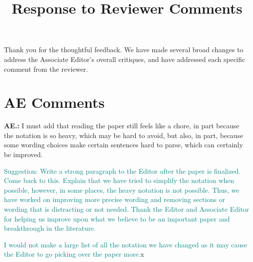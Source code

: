 \documentclass[letterpaper, parskip]{scrartcl}
\newcommand{\pointRaised}[2]{%
	\textbf{#1.\theresponsectr:} #2
}
\newcounter{responsectr}[section]     %
\begin{document}

	\title{Response to Reviewer Comments}
	\maketitle
	
Thank you for the thoughtful feedback. We have made several broad changes to address the Associate Editor's overall critiques, and have addressed each specific comment from the reviewer.

\section{AE Comments}

\pointRaised{AE}{I must add that reading the paper still feels like a chore, in part because the notation is so heavy, which may be hard to avoid, but also, in part, because some wording choices make certain sentences hard to parse, which can certainly be improved.}

\textcolor{teal}{Suggestion: Write a strong paragraph to the Editor after the paper is finalized. Come back to this. Explain that we have tried to simplify the notation when possible, however, in some places, the heavy notation is not possible. Thus, we have worked on improving more precise wording and removing sections or wording that is distracting or not needed. Thank the Editor and Associate Editor for helping us improve upon what we believe to be an important paper and breakthrough in the literature.} 

\textcolor{teal}{I would not make a large list of all the notation we have changed as it may cause the Editor to go picking over the paper more.}x
\end{document}
